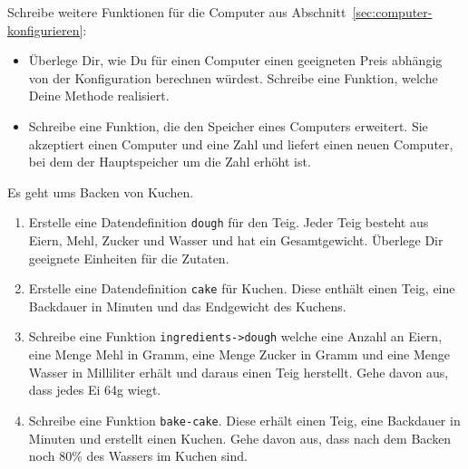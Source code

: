 \begin{aufgabe}

  Schreibe weitere Funktionen für die Computer aus Abschnitt~\ref{sec:computer-konfigurieren}:
  \begin{itemize}
  \item Überlege Dir, wie Du für einen Computer einen
    geeigneten Preis abhängig von der Konfiguration berechnen würdest.
    Schreibe eine Funktion, welche Deine Methode realisiert.
  \item Schreibe eine Funktion, die den Speicher eines Computers
    erweitert.  Sie akzeptiert einen Computer und eine Zahl und liefert
    einen neuen Computer, bei dem der Hauptspeicher um die Zahl erhöht
    ist.
  \end{itemize}
\end{aufgabe}

\begin{aufgabe}

  Es geht ums Backen von Kuchen.

  \begin{enumerate}
  \item Erstelle eine Datendefinition
    \texttt{dough} für den Teig.  Jeder Teig besteht aus Eiern, Mehl,
    Zucker und Wasser und hat ein Gesamtgewicht.  Überlege Dir
    geeignete Einheiten für die Zutaten.
  \item Erstelle eine Datendefinition \texttt{cake}
    für Kuchen.  Diese enthält einen Teig, eine Backdauer in Minuten und 
    das Endgewicht des Kuchens.
  \item Schreibe eine Funktion
    \texttt{ingredients->dough} welche eine Anzahl an Eiern, eine
    Menge Mehl in Gramm, eine Menge Zucker in Gramm und eine
    Menge Wasser in Milliliter erhält und daraus einen Teig
    herstellt. Gehe davon aus, dass jedes Ei 64g wiegt.
  \item Schreibe eine Funktion \texttt{bake-cake}. 
    Diese erhält einen Teig, eine Backdauer in Minuten und erstellt einen 
    Kuchen.  Gehe davon aus, dass nach dem Backen noch 80\% des
    Wassers im Kuchen sind.
  \end{enumerate}
  
\end{aufgabe}


